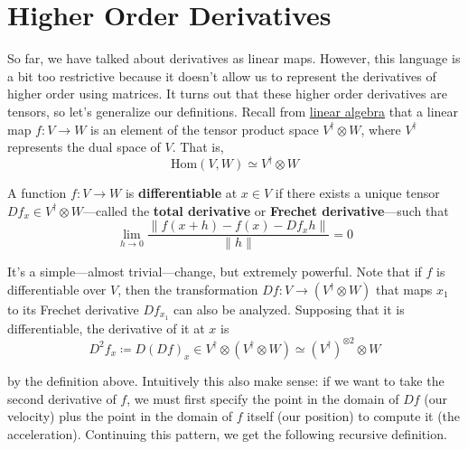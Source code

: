 \section{Higher Order Derivatives} 

  So far, we have talked about derivatives as linear maps. However, this language is a bit too restrictive because it doesn't allow us to represent the derivatives of higher order using matrices. It turns out that these higher order derivatives are tensors, so let's generalize our definitions. Recall from \hyperref[la-linmaps_are_tensors]{linear algebra} that a linear map $f: V \to W$ is an element of the tensor product space $V^\dagger \otimes W$, where $V^\dagger$ represents the dual space of $V$. That is, 
  \begin{equation}
    \mathrm{Hom}(V, W) \simeq V^\dagger \otimes W
  \end{equation}

  \begin{definition}
    A function $f: V \longrightarrow W$ is \textbf{differentiable} at $x \in V$ if there exists a unique tensor $D f_x \in V^\dagger \otimes W$---called the \textbf{total derivative} or \textbf{Frechet derivative}---such that 
    \begin{equation}
      \lim_{h \to 0} \frac{\| f(x + h) - f(x) - D f_x h \|}{\| h \|} = 0 
    \end{equation} 
  \end{definition}

  It's a simple---almost trivial---change, but extremely powerful. Note that if $f$ is differentiable over $V$, then the transformation $Df: V \to (V^\dagger \otimes W)$ that maps $x_1$ to its Frechet derivative $Df_{x_1}$ can also be analyzed. Supposing that it is differentiable, the derivative of it at $x$ is 
  \begin{equation}
    D^2 f_x \coloneqq D(Df)_x \in V^\dagger \otimes (V^\dagger \otimes W) \simeq (V^\dagger)^{\otimes 2} \otimes W
  \end{equation}

  by the definition above. Intuitively this also make sense: if we want to take the second derivative of $f$, we must first specify the point in the domain of $Df$ (our velocity) plus the point in the domain of $f$ itself (our position) to compute it (the acceleration). Continuing this pattern, we get the following recursive definition. 

